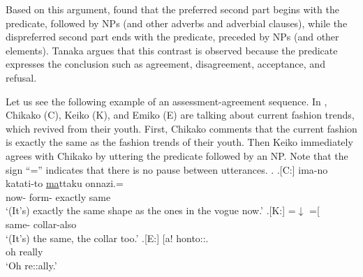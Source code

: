 Based on this argument,
 found that the preferred second part begins with the predicate, followed by NPs (and other adverbs and adverbial clauses),
while the dispreferred second part ends with the predicate,
preceded by NPs (and other elements).
Tanaka argues that this contrast is observed because
the predicate expresses the conclusion such as agreement, disagreement, acceptance, and refusal.

Let us see the following example of an assessment-agreement sequence.
In \Next,
Chikako (C), Keiko (K), and Emiko (E) are talking about current fashion trends, which revived from their youth.
First, Chikako comments that the current fashion is exactly the same as the fashion trends of their youth.
Then Keiko immediately agrees with Chikako
by uttering the predicate followed by an NP.
Note that the sign ``='' indicates that there is no pause between utterances.
%
\ex.
 \ag.[C:] ima-no katati-to \ul{ma}ttaku onnazi.= \\
                now- form- exactly same \\
                `(It's) exactly the same shape as the ones in the vogue now.'
 \bg.[K:] =$\downarrow$ =[ \\
          \hspace{0.2cm}same- \hspace{0.3cm}collar-also \\
          `(It's) the same, the collar too.'
 \bg.[E:] {\hspace{2.5cm}} [a! honto::. \\
          {} oh really \\
          {\hspace{2.5cm}}`Oh re::ally.'
          \hfill{\cite[406]{tanaka05}}

